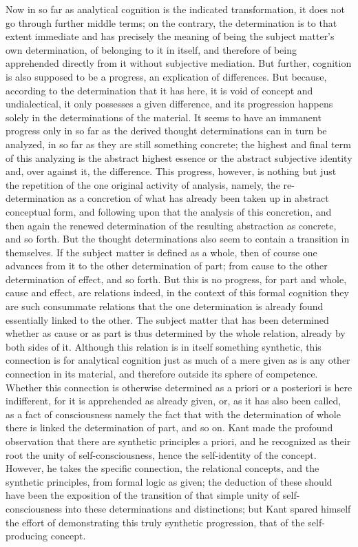 Now in so far as analytical cognition is
the indicated transformation,
it does not go through further middle terms;
on the contrary, the determination is
to that extent immediate
and has precisely the meaning of
being the subject matter's own determination,
of belonging to it in itself,
and therefore of being apprehended directly
from it without subjective mediation.
But further, cognition is also
supposed to be a progress,
an explication of differences.
But because, according to
the determination that it has here,
it is void of concept and undialectical,
it only possesses a given difference,
and its progression happens solely
in the determinations of the material.
It seems to have an immanent progress
only in so far as the derived thought
determinations can in turn be analyzed,
in so far as they are still something concrete;
the highest and final term of this analyzing is
the abstract highest essence
or the abstract subjective identity
and, over against it, the difference.
This progress, however, is nothing
but just the repetition of
the one original activity of analysis, namely,
the re-determination as a concretion of
what has already been taken up in abstract conceptual form,
and following upon that the analysis of this concretion,
and then again the renewed determination of
the resulting abstraction as concrete, and so forth.
But the thought determinations also
seem to contain a transition in themselves.
If the subject matter is defined as a whole,
then of course one advances from it
to the other determination of part;
from cause to the other determination
of effect, and so forth.
But this is no progress,
for part and whole, cause and effect,
are relations indeed,
in the context of this formal cognition
they are such consummate relations
that the one determination is
already found essentially linked to the other.
The subject matter that has been determined
whether as cause or as part is
thus determined by the whole relation,
already by both sides of it.
Although this relation is in itself something synthetic,
this connection is for analytical cognition
just as much of a mere given as is
any other connection in its material,
and therefore outside its sphere of competence.
Whether this connection is otherwise determined as
a priori or a posteriori is here indifferent,
for it is apprehended as already given,
or, as it has also been called,
as a fact of consciousness
namely the fact that with the determination of whole there
is linked the determination of part, and so on.
Kant made the profound observation that
there are synthetic principles a priori,
and he recognized as their root
the unity of self-consciousness,
hence the self-identity of the concept.
However, he takes the specific connection,
the relational concepts,
and the synthetic principles,
from formal logic as given;
the deduction of these should have been the exposition of
the transition of that simple unity of self-consciousness
into these determinations and distinctions;
but Kant spared himself the effort of demonstrating
this truly synthetic progression,
that of the self-producing concept.

